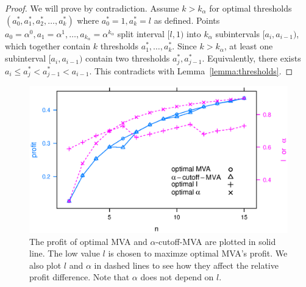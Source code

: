\begin{proof}
We will prove by contradiction. Assume $k > k_\alpha$ for optimal thresholds
$(a^*_0, a^*_1, a^*_2, \ldots, a^*_k)$ where $a^*_0 = 1, a^*_k = l$ as defined.  Points
$a_0 = \alpha^0, a_1 = \alpha^1, \ldots, a_{k_\alpha} = \alpha^{k_\alpha}$
split interval $[l, 1)$ into $k_\alpha$ subintervals $[a_i, a_{i-1})$, which
together contain $k$ thresholds $a^*_1, \ldots, a^*_k$. Since $k > k_\alpha$, at
least one subinterval $[a_i, a_{i-1})$ contain two thresholds $a^*_j, a^*_{j-1}$.
Equivalently, there exists $a_i \leq a^*_j < a^*_{j-1} < a_{i-1}$.  This
contradicts with Lemma~\ref{lemma:thresholds}.
\end{proof}

\begin{figure}
\centering
    \includegraphics[width=\linewidth]{figures/cutoff_.2_.1_15.eps}
    \caption{The profit of optimal MVA and $\alpha$-cutoff-MVA are plotted in
    solid line.  The low value $l$ is chosen to maximze optimal MVA's profit.
    We also plot $l$ and $\alpha$ in dashed lines to see how they affect the
    relative profit difference.  Note that $\alpha$ does not depend on
    $l$.}\label{fig:cutoff}
\end{figure}

